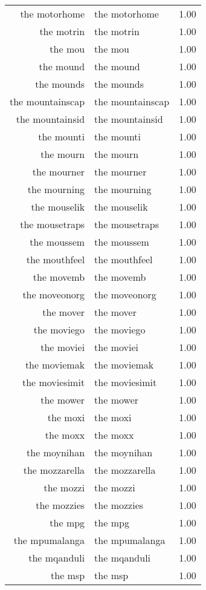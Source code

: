 \begin{table}[ht]
\begin{tabular}{rlr}
  the motorhome & the motorhome & 1.00 \\ 
  the motrin & the motrin & 1.00 \\ 
  the mou & the mou & 1.00 \\ 
  the mound & the mound & 1.00 \\ 
  the mounds & the mounds & 1.00 \\ 
  the mountainscap & the mountainscap & 1.00 \\ 
  the mountainsid & the mountainsid & 1.00 \\ 
  the mounti & the mounti & 1.00 \\ 
  the mourn & the mourn & 1.00 \\ 
  the mourner & the mourner & 1.00 \\ 
  the mourning & the mourning & 1.00 \\ 
  the mouselik & the mouselik & 1.00 \\ 
  the mousetraps & the mousetraps & 1.00 \\ 
  the moussem & the moussem & 1.00 \\ 
  the mouthfeel & the mouthfeel & 1.00 \\ 
  the movemb & the movemb & 1.00 \\ 
  the moveonorg & the moveonorg & 1.00 \\ 
  the mover & the mover & 1.00 \\ 
  the moviego & the moviego & 1.00 \\ 
  the moviei & the moviei & 1.00 \\ 
  the moviemak & the moviemak & 1.00 \\ 
  the moviesimit & the moviesimit & 1.00 \\ 
  the mower & the mower & 1.00 \\ 
  the moxi & the moxi & 1.00 \\ 
  the moxx & the moxx & 1.00 \\ 
  the moynihan & the moynihan & 1.00 \\ 
  the mozzarella & the mozzarella & 1.00 \\ 
  the mozzi & the mozzi & 1.00 \\ 
  the mozzies & the mozzies & 1.00 \\ 
  the mpg & the mpg & 1.00 \\ 
  the mpumalanga & the mpumalanga & 1.00 \\ 
  the mqanduli & the mqanduli & 1.00 \\ 
  the msp & the msp & 1.00 \\ 

\end{tabular}
\end{table}
